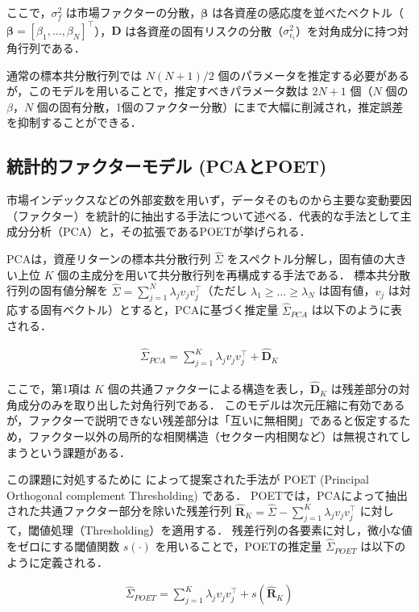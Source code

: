 \documentclass[lualatex,a4paper,11pt]{jlreq}
\begin{document}
ここで，$\sigma_f^2$ は市場ファクターの分散，$\symbf{\beta}$ は各資産の感応度を並べたベクトル（$\symbf{\beta} = [\beta_1, \dots, \beta_N]^\top$），$\symbf{D}$ は各資産の固有リスクの分散（$\sigma_{\epsilon_i}^2$）を対角成分に持つ対角行列である．

通常の標本共分散行列では $N(N+1)/2$ 個のパラメータを推定する必要があるが，このモデルを用いることで，推定すべきパラメータ数は $2N+1$ 個（$N$ 個の $\beta$，$N$ 個の固有分散，1個のファクター分散）にまで大幅に削減され，推定誤差を抑制することができる．

\subsection{統計的ファクターモデル (PCAとPOET)}
市場インデックスなどの外部変数を用いず，データそのものから主要な変動要因（ファクター）を統計的に抽出する手法について述べる．代表的な手法として主成分分析（PCA）と，その拡張であるPOETが挙げられる．

PCAは，資産リターンの標本共分散行列 $\hat{\Sigma}$ をスペクトル分解し，固有値の大きい上位 $K$ 個の主成分を用いて共分散行列を再構成する手法である．
標本共分散行列の固有値分解を $\hat{\Sigma} = \sum_{j=1}^{N} \lambda_j v_j v_j^\top$（ただし $\lambda_1 \ge \dots \ge \lambda_N$ は固有値，$v_j$ は対応する固有ベクトル）とすると，PCAに基づく推定量 $\hat{\Sigma}_{PCA}$ は以下のように表される．

\begin{align}
    \hat{\Sigma}_{PCA} = \sum_{j=1}^{K} \lambda_j v_j v_j^\top + \hat{\symbf{D}}_K
\end{align}

ここで，第1項は $K$ 個の共通ファクターによる構造を表し，$\hat{\symbf{D}}_K$ は残差部分の対角成分のみを取り出した対角行列である．
このモデルは次元圧縮に有効であるが，ファクターで説明できない残差部分は「互いに無相関」であると仮定するため，ファクター以外の局所的な相関構造（セクター内相関など）は無視されてしまうという課題がある．

この課題に対処するために \citet{Fan2013} によって提案された手法が POET (Principal Orthogonal complement Thresholding) である．
POETでは，PCAによって抽出された共通ファクター部分を除いた残差行列 $\hat{\symbf{R}}_K = \hat{\Sigma} - \sum_{j=1}^{K} \lambda_j v_j v_j^\top$ に対して，閾値処理（Thresholding）を適用する．
残差行列の各要素に対し，微小な値をゼロにする閾値関数 $s(\cdot)$ を用いることで，POETの推定量 $\hat{\Sigma}_{POET}$ は以下のように定義される．

\begin{align}
    \hat{\Sigma}_{POET} = \sum_{j=1}^{K} \lambda_j v_j v_j^\top + s(\hat{\symbf{R}}_K)
\end{align}
\end{document}
